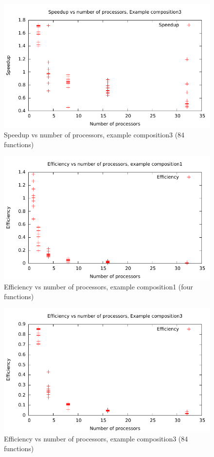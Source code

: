 \documentclass{acm_proc_article-sp}
\begin{document}
\begin{figure}[ht] 
	\centering
	\includegraphics[scale=0.6]{../../data/composite3-speedup.pdf}
	\caption{Speedup vs number of processors, example composition3 (84
	functions)} 
	\label{fig:c3s} 
\end{figure} 

\begin{figure}[ht] 
	\centering
	\includegraphics[scale=0.6]{../../data/composite1-efficiency.pdf}
	\caption{Efficiency vs number of processors, example composition1 (four
	functions)} 
	\label{fig:c1e}
\end{figure} 

\begin{figure}[ht] 
	\centering
	\includegraphics[scale=0.6]{../../data/composite3-efficiency.pdf}
	\caption{Efficiency vs number of processors, example composition3 (84
	functions)} 
	\label{fig:c3e} 
\end{figure}
\end{document}
